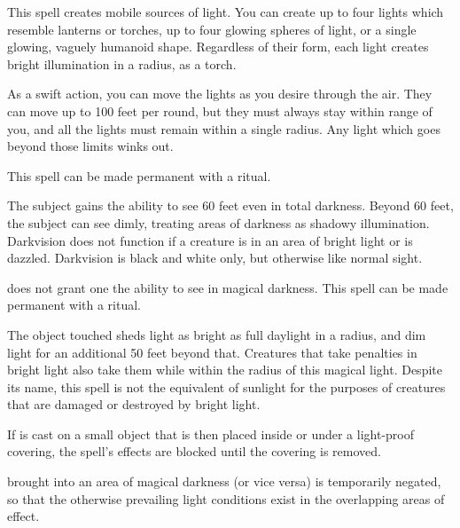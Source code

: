 \spelldur{\durshort \dismissable}
\begin{spelleffect}
    This spell creates mobile sources of light. You can create up to four lights which resemble lanterns or torches, up to four glowing spheres of light, or a single glowing, vaguely humanoid shape. Regardless of their form, each light creates bright illumination in a \areamed radius, as a torch.

    As a swift action, you can move the lights as you desire through the air. They can move up to 100 feet per round, but they must always stay within range of you, and all the lights must remain within a single \areamed radius. Any light which goes beyond those limits winks out.
\end{spelleffect}
\begin{spellnotes}
    This spell can be made permanent with a  ritual.
\end{spellnotes}

\spelldur{\durlong}
\begin{spelleffect}
    The subject gains the ability to see 60 feet even in total darkness. Beyond 60 feet, the subject can see dimly, treating areas of darkness as shadowy illumination. Darkvision does not function if a creature is in an area of bright light or is dazzled. Darkvision is black and white only, but otherwise like normal sight.
\end{spelleffect}
\begin{spellnotes}
     does not grant one the ability to see in magical darkness. This spell can be made permanent with a  ritual.
\end{spellnotes}

\spelldur{\durlong \dismissable}
\begin{spelleffect}
    The object touched sheds light as bright as full daylight in a \arealarge radius, and dim light for an additional 50 feet beyond that. Creatures that take penalties in bright light also take them while within the radius of this magical light. Despite its name, this spell is not the equivalent of sunlight for the purposes of creatures that are damaged or destroyed by bright light.
    \par If  is cast on a small object that is then placed inside or under a light-proof covering, the spell's effects are blocked until the covering is removed.
\end{spelleffect}
\begin{spellnotes}
     brought into an area of magical darkness (or vice versa) is temporarily negated, so that the otherwise prevailing light conditions exist in the overlapping areas of effect.
\end{spellnotes}


